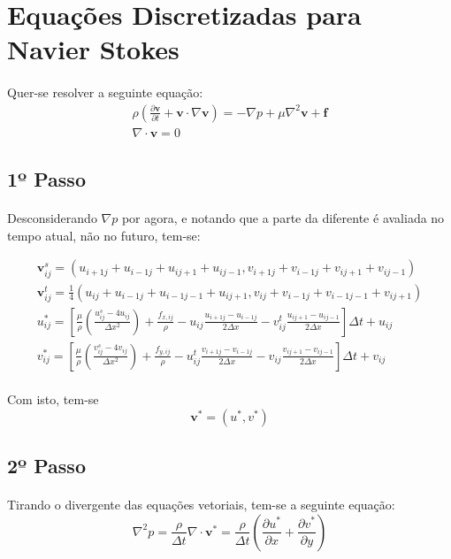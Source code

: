 \documentclass[a4paper,11pt]{article}
\title{}
\author{Ataias Reis}
\begin{document}
\section{Equações Discretizadas para Navier Stokes}

\paragraph{} Quer-se resolver a seguinte equação:
\begin{eqnarray}
\rho\left( \frac{\partial \textbf{v}}{\partial t}+\textbf{v}\cdot\nabla\textbf{v}\right)=-\nabla p+\mu\nabla^2\textbf{v}+\textbf{f}\\
\nabla\cdot \textbf{v}=0
\end{eqnarray}
\subsection{1º Passo}
\paragraph{} Desconsiderando $\nabla p$ por agora, e notando que a parte da diferente é avaliada no tempo atual, não no futuro, tem-se:

\begin{eqnarray}
\textbf{v}_{ij}^s=(u_{i+1j}+u_{i-1j}+u_{ij+1}+u_{ij-1},v_{i+1j}+v_{i-1j}+v_{ij+1}+v_{ij-1})\\
\textbf{v}_{ij}^t=\frac{1}{4}(u_{ij}+u_{i-1j}+u_{i-1j-1}+u_{ij+1},v_{ij}+v_{i-1j}+v_{i-1j-1}+v_{ij+1})\\
u_{ij}^{*}=\left[\frac{\mu}{\rho}\left(\frac{u_{ij}^s-4u_{ij}}{\Delta x^2}\right)+\frac{f_{x,ij}}{\rho}-u_{ij}\frac{u_{i+1j}-u_{i-1j}}{2\Delta x}-v_{ij}^t\frac{u_{ij+1}-u_{ij-1}}{2\Delta x}\right]\Delta t + u_{ij}\\
v_{ij}^{*}=\left[\frac{\mu}{\rho}\left(\frac{v_{ij}^s-4v_{ij}}{\Delta x^2}\right)+\frac{f_{y,ij}}{\rho}-u_{ij}^t\frac{v_{i+1j}-v_{i-1j}}{2\Delta x}-v_{ij}\frac{v_{ij+1}-v_{ij-1}}{2\Delta x}\right]\Delta t + v_{ij}
\end{eqnarray}

\paragraph{} Com isto, tem-se \[\textbf{v}^{*}=(u^*,v^*)\]
\subsection{2º Passo}
\paragraph{} Tirando o divergente das equações vetoriais, tem-se a seguinte equação:
\begin{equation}
\nabla^2 p = \frac{\rho}{\Delta t} \nabla\cdot \textbf{v}^*=\frac{\rho}{\Delta t} 
\left( \frac{\partial u^*}{\partial x}+\frac{\partial v^*}{\partial y} \right)
\end{equation}
\end{document}
